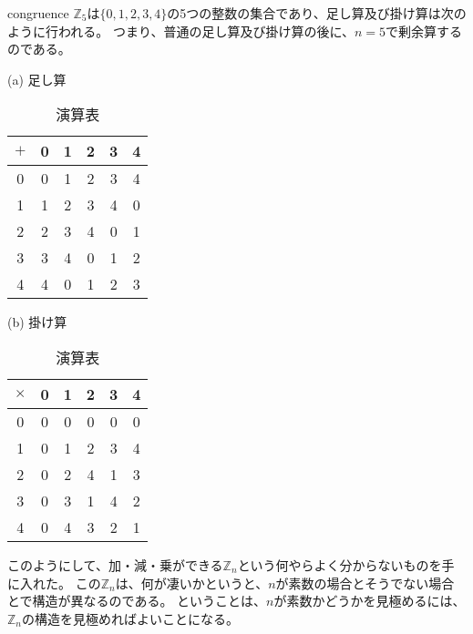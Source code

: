 \begin{Exam}{}{congruence}
$\mathbb{Z}_5$は$\{0,1,2,3,4\}$の5つの整数の集合であり、足し算及び掛け算は次のように行われる。
つまり、普通の足し算及び掛け算の後に、$n=5$で剰余算するのである。
\begin{table}[htbp] \label{table:congruence}\caption{演算表}
 \begin{minipage}[t]{.45\textwidth}
  \begin{center}
   (a) 足し算\\
   \begin{tabular}{|c||c|c|c|c|c|} \hline
    $+$ & 0 & 1 & 2 & 3 & 4 \\ \hline\hline
    0   & 0 & 1 & 2 & 3 & 4 \\ \hline
    1   & 1 & 2 & 3 & 4 & 0 \\ \hline
    2   & 2 & 3 & 4 & 0 & 1 \\ \hline
    3   & 3 & 4 & 0 & 1 & 2 \\ \hline
    4   & 4 & 0 & 1 & 2 & 3 \\ \hline
   \end{tabular}
  \end{center}
 \end{minipage}
 \hfill
 \begin{minipage}[t]{.45\textwidth}
  \begin{center}
   (b) 掛け算\\
   \begin{tabular}{|c||c|c|c|c|c|} \hline
    $\times$ & 0 & 1 & 2 & 3 & 4 \\ \hline\hline
    0        & 0 & 0 & 0 & 0 & 0 \\ \hline
    1        & 0 & 1 & 2 & 3 & 4 \\ \hline
    2        & 0 & 2 & 4 & 1 & 3 \\ \hline
    3        & 0 & 3 & 1 & 4 & 2 \\ \hline
    4        & 0 & 4 & 3 & 2 & 1 \\ \hline
   \end{tabular}
  \end{center}
 \end{minipage}
\end{table}
\end{Exam}

このようにして、加・減・乗ができる$\mathbb{Z}_n$という何やらよく分からないものを手に入れた。
この$\mathbb{Z}_n$は、何が凄いかというと、$n$が素数の場合とそうでない場合とで構造が異なるのである。
ということは、$n$が素数かどうかを見極めるには、$\mathbb{Z}_n$の構造を見極めればよいことになる。

